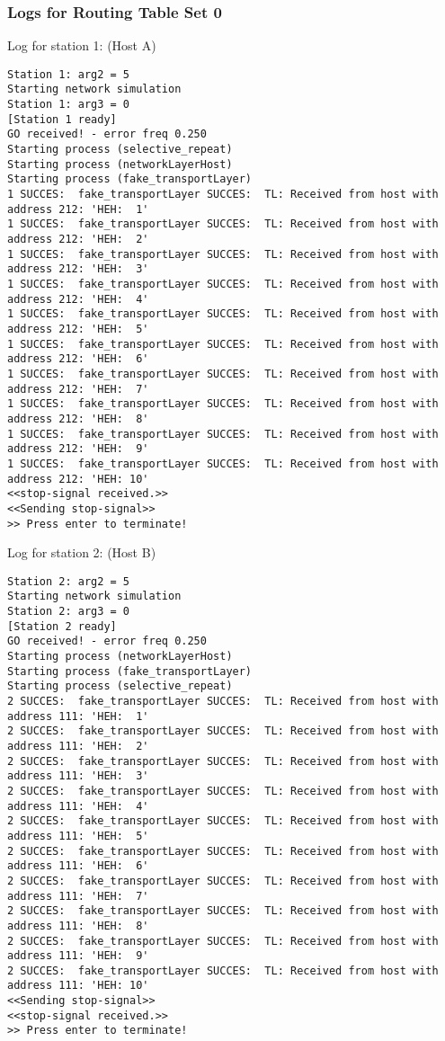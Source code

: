 \subsubsection{Logs for Routing Table Set 0}
Log for station 1: (Host A)
\begin{lstlisting}[breaklines=true]
Station 1: arg2 = 5
Starting network simulation
Station 1: arg3 = 0
[Station 1 ready]
GO received! - error freq 0.250
Starting process (selective_repeat)
Starting process (networkLayerHost)
Starting process (fake_transportLayer)
1 SUCCES:  fake_transportLayer SUCCES:  TL: Received from host with address 212: 'HEH:  1'
1 SUCCES:  fake_transportLayer SUCCES:  TL: Received from host with address 212: 'HEH:  2'
1 SUCCES:  fake_transportLayer SUCCES:  TL: Received from host with address 212: 'HEH:  3'
1 SUCCES:  fake_transportLayer SUCCES:  TL: Received from host with address 212: 'HEH:  4'
1 SUCCES:  fake_transportLayer SUCCES:  TL: Received from host with address 212: 'HEH:  5'
1 SUCCES:  fake_transportLayer SUCCES:  TL: Received from host with address 212: 'HEH:  6'
1 SUCCES:  fake_transportLayer SUCCES:  TL: Received from host with address 212: 'HEH:  7'
1 SUCCES:  fake_transportLayer SUCCES:  TL: Received from host with address 212: 'HEH:  8'
1 SUCCES:  fake_transportLayer SUCCES:  TL: Received from host with address 212: 'HEH:  9'
1 SUCCES:  fake_transportLayer SUCCES:  TL: Received from host with address 212: 'HEH: 10'
<<stop-signal received.>>
<<Sending stop-signal>>
>> Press enter to terminate!
\end{lstlisting}

Log for station 2: (Host B)
\begin{lstlisting}[breaklines=true]
Station 2: arg2 = 5
Starting network simulation
Station 2: arg3 = 0
[Station 2 ready]
GO received! - error freq 0.250
Starting process (networkLayerHost)
Starting process (fake_transportLayer)
Starting process (selective_repeat)
2 SUCCES:  fake_transportLayer SUCCES:  TL: Received from host with address 111: 'HEH:  1'
2 SUCCES:  fake_transportLayer SUCCES:  TL: Received from host with address 111: 'HEH:  2'
2 SUCCES:  fake_transportLayer SUCCES:  TL: Received from host with address 111: 'HEH:  3'
2 SUCCES:  fake_transportLayer SUCCES:  TL: Received from host with address 111: 'HEH:  4'
2 SUCCES:  fake_transportLayer SUCCES:  TL: Received from host with address 111: 'HEH:  5'
2 SUCCES:  fake_transportLayer SUCCES:  TL: Received from host with address 111: 'HEH:  6'
2 SUCCES:  fake_transportLayer SUCCES:  TL: Received from host with address 111: 'HEH:  7'
2 SUCCES:  fake_transportLayer SUCCES:  TL: Received from host with address 111: 'HEH:  8'
2 SUCCES:  fake_transportLayer SUCCES:  TL: Received from host with address 111: 'HEH:  9'
2 SUCCES:  fake_transportLayer SUCCES:  TL: Received from host with address 111: 'HEH: 10'
<<Sending stop-signal>>
<<stop-signal received.>>
>> Press enter to terminate!
\end{lstlisting}

